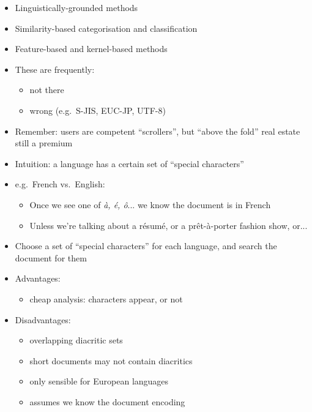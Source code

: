 \documentclass[a4paper,landscape,headrule,footrule,xetex]{foils}
\begin{document}

\begin{itemize}
\item Linguistically-grounded methods
\item Similarity-based categorisation and classification
\item Feature-based and kernel-based methods
\end{itemize}







\begin{itemize}
\item These are frequently:
\begin{itemize}
\item not there
\item wrong (e.g.\ S-JIS, EUC-JP, UTF-8)
\end{itemize}
\item Remember: users are competent ``scrollers'', but ``above the
  fold'' real estate still a premium
\end{itemize}
















\begin{itemize}
\item Intuition: a language has a certain set of ``special characters''
\item e.g.\ French vs.\ English:
\begin{itemize}
\item Once we see one of \textit{\`a, \'e, \^o}... we know the document is in French
\item Unless we're talking about a r\'esum\'e, or a pr\^et-\`a-porter fashion show, or...
\end{itemize}
\item Choose a set of ``special characters'' for each language, and search the document for them
\pagebreak
\item Advantages:
  \begin{itemize}
  \item cheap analysis: characters appear, or not
  \end{itemize}
\item Disadvantages:
  \begin{itemize}
  \item overlapping diacritic sets
  \item short documents may not contain diacritics
  \item only sensible for European languages
  \item assumes we know the document encoding
  \end{itemize}
\end{itemize}
\end{document}
